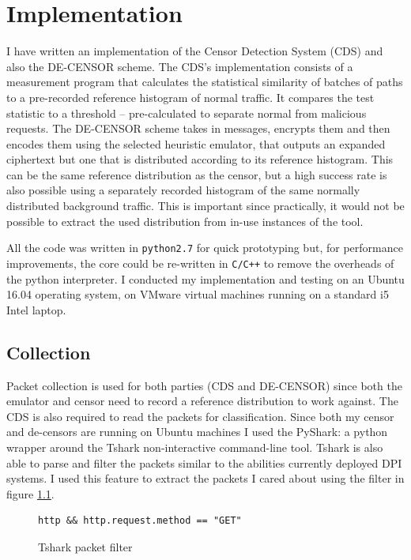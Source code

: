\documentclass[ %
                    author={Samuel Russell},
                supervisor={Prof. Bogdan Warinschi},
                    degree={MEng},
                     title={Innocuous Ciphertexts},
                  subtitle={The DE-CENSOR Scheme},
                      type={research},
                      year={2018} ]{dissertation}
\begin{document}



\chapter{Implementation}

I have written an implementation of the Censor Detection System (CDS) and also the DE-CENSOR scheme.
The CDS's implementation consists of a measurement program that calculates the statistical similarity of batches of paths to a pre-recorded reference histogram of normal traffic.
It compares the test statistic to a threshold -- pre-calculated to separate normal from malicious requests.
The DE-CENSOR scheme takes in messages, encrypts them and then encodes them using the selected heuristic emulator, that outputs an expanded ciphertext but one that is distributed according to its reference histogram. This can be the same reference distribution as the censor, but a high success rate is also possible using a separately recorded histogram of the same normally distributed background traffic.
This is important since practically, it would not be possible to extract the used distribution from in-use instances of the tool.

All the code was written in \texttt{python2.7} for quick prototyping but, for performance improvements, the core could be re-written in \texttt{C/C++} to remove the overheads of the python interpreter. I conducted my implementation and testing on an Ubuntu 16.04 operating system, on VMware virtual machines running on a standard i5 Intel laptop.

\section{Collection}

Packet collection is used for both parties (CDS and DE-CENSOR) since both the emulator and censor need to record a reference distribution to work against. The CDS is also required to read the packets for classification. Since both my censor and de-censors are running on Ubuntu machines I used the PyShark: a python wrapper around the Tshark non-interactive command-line tool. Tshark is also able to parse and filter the packets similar to the abilities currently deployed DPI systems. I used this feature to extract the packets I cared about using the filter in figure \ref{fig:filter}.

\begin{figure}[h]
\begin{verbatim}
http && http.request.method == "GET"
\end{verbatim}
\caption{Tshark packet filter}
\label{fig:filter}
\end{figure}
\end{document}
